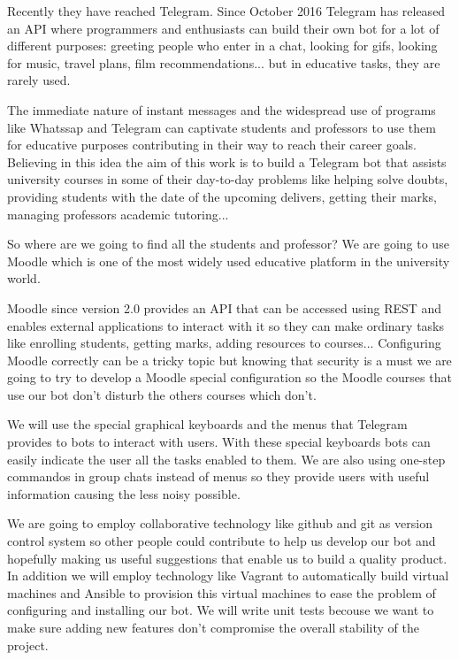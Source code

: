\par

Recently they have reached Telegram. Since October 2016 Telegram has released an API where programmers and enthusiasts can build their own bot for a lot of different purposes: greeting people who enter in a chat, looking for gifs, looking for music, travel plans, film recommendations... but in educative tasks, they are rarely used.

\par

The immediate nature of instant messages and the widespread use of programs like Whatssap and Telegram can captivate students and professors to  use them for educative purposes contributing in their way to reach their career goals. Believing in this idea the aim of this work is to build a Telegram bot that assists university courses in some of their day-to-day problems like helping solve doubts, providing students with the date of the upcoming delivers, getting their marks, managing professors academic tutoring... 
\par
So where are we going to find all the students and professor? We are going to use Moodle which is one of the most widely used educative platform in the university world.
\par
Moodle since version 2.0 provides an API that can be accessed using REST and enables external applications to interact with it so they can  make ordinary tasks like enrolling students, getting marks, adding resources to courses... Configuring Moodle correctly can be a tricky topic but knowing that security is a must we are going to try to develop a Moodle special configuration so the Moodle courses that use our bot don't disturb the others courses which don't.
\par 
We will use the special graphical keyboards and the menus that Telegram provides to bots to interact with users. With these special keyboards bots can easily indicate the user all the tasks enabled to them. We are also using one-step commandos in group chats instead of menus so they provide users with useful information causing the less noisy possible.
\par
We are going to employ collaborative technology like github and git as version control system so other people could contribute to help us develop our bot and hopefully making us useful suggestions that enable us to build a quality product. In addition we will employ technology like Vagrant to automatically build virtual machines and Ansible to provision this virtual machines to ease the problem of configuring and installing our bot. We will write unit tests becouse we want to make sure adding new features don't compromise the overall stability of the project.
\par

